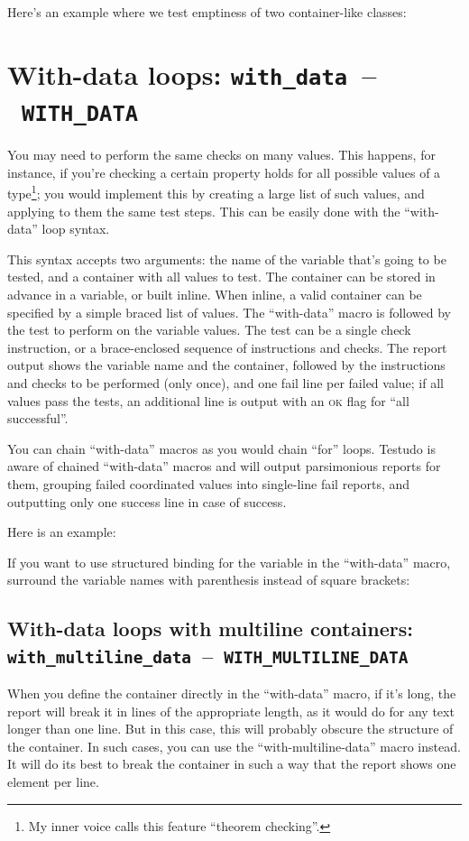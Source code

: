 \documentclass[twoside, a4paper, article]{memoir}
\newcommand*\testudocolor{\color{red!80!blue}}
\newcommand*\testudo[1]{\texttt{\testudocolor{}#1}}
\newcommand*\testudopair[2]{\testudo{#1}~--~\testudo{#2}}
\newcommand\chaptertestudopair[3]{%
  \chapter[#1]{#1: \testudopair{#2}{#3}}}
\newcommand\sectiontestudopair[3]{%
  \section[#1]{#1: \testudopair{#2}{#3}}}
\providecommand\typesetexample[1]{%
}
\begin{document}
Here's an example where we test emptiness of two container-like classes:

\typesetexample{test-aware-functions}


\chaptertestudopair{With-data loops}{with\_data}{WITH\_DATA}
\label{cha:with-data-loops}

You may need to perform the same checks on many values.  This happens, for
instance, if you're checking a certain property holds for all possible values
of a type\footnote{My inner voice calls this feature ``theorem checking''.};
you would implement this by creating a large list of such values, and applying
to them the same test steps.  This can be easily done with the ``with-data''
loop syntax.

This syntax accepts two arguments: the name of the variable that's going to be
tested, and a container with all values to test.  The container can be stored
in advance in a variable, or built inline.  When inline, a valid container can
be specified by a simple braced list of values.  The ``with-data'' macro is
followed by the test to perform on the variable values.  The test can be a
single check instruction, or a brace-enclosed sequence of instructions and
checks.  The report output shows the variable name and the container, followed
by the instructions and checks to be performed (only once), and one fail line
per failed value; if all values pass the tests, an additional line is output
with an \textsc{ok} flag for ``all successful''.

You can chain ``with-data'' macros as you would chain ``for'' loops.  Testudo
is aware of chained ``with-data'' macros and will output parsimonious reports
for them, grouping failed coordinated values into single-line fail reports, and
outputting only one success line in case of success.

Here is an example:

\typesetexample{with-data}

If you want to use structured binding for the variable in the ``with-data''
macro, surround the variable names with parenthesis instead of square brackets:

\typesetexample{with-data-structured-binding}

\sectiontestudopair{With-data loops with multiline containers}%
  {with\_multiline\_data}{WITH\_MULTILINE\_DATA}

When you define the container directly in the ``with-data'' macro, if it's
long, the report will break it in lines of the appropriate length, as it would
do for any text longer than one line.  But in this case, this will probably
obscure the structure of the container.  In such cases, you can use the
``with-multiline-data'' macro instead.  It will do its best to break the
container in such a way that the report shows one element per line.
\end{document}
